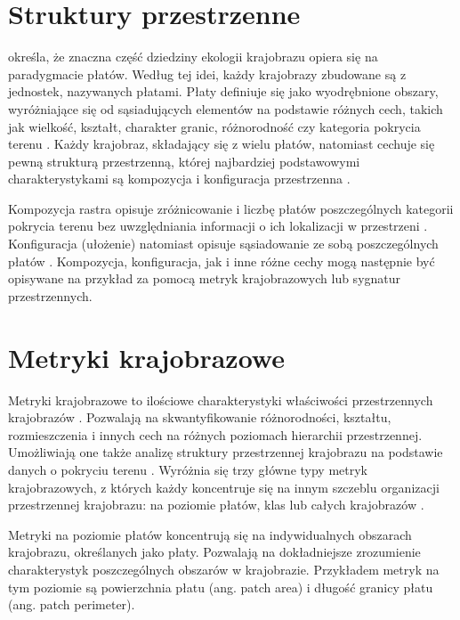 \documentclass{amuthesis}
\begin{document}
\hypertarget{struktury-przestrzenne}{%
\section{Struktury przestrzenne}\label{struktury-przestrzenne}}

\textcite{mcgarigal2009} określa, że znaczna część dziedziny ekologii
krajobrazu opiera się na paradygmacie płatów. Według tej idei, każdy
krajobrazy zbudowane są z jednostek, nazywanych płatami. Płaty definiuje
się jako wyodrębnione obszary, wyróżniające się od sąsiadujących
elementów na podstawie różnych cech, takich jak wielkość, kształt,
charakter granic, różnorodność czy kategoria pokrycia terenu
\autocite{forman1995land,solon2002,German_2004}. Każdy krajobraz,
składający się z wielu płatów, natomiast cechuje się pewną strukturą
przestrzenną, której najbardziej podstawowymi charakterystykami są
kompozycja i konfiguracja przestrzenna \autocite{Gustafson1998}.

Kompozycja rastra opisuje zróżnicowanie i liczbę płatów poszczególnych
kategorii pokrycia terenu bez uwzględniania informacji o ich lokalizacji
w przestrzeni \autocite{Gustafson1998,solon2002,kozak2014}. Konfiguracja
(ułożenie) natomiast opisuje sąsiadowanie ze sobą poszczególnych płatów
\autocite{Gustafson1998,solon2002,kozak2014}. Kompozycja, konfiguracja,
jak i inne różne cechy mogą następnie być opisywane na przykład za
pomocą metryk krajobrazowych lub sygnatur przestrzennych.

\hypertarget{metryki-krajobrazowe}{%
\section{Metryki krajobrazowe}\label{metryki-krajobrazowe}}

Metryki krajobrazowe to ilościowe charakterystyki właściwości
przestrzennych krajobrazów \autocite{McGarigal_fragstats}. Pozwalają na
skwantyfikowanie różnorodności, kształtu, rozmieszczenia i innych cech
na różnych poziomach hierarchii przestrzennej. Umożliwiają one także
analizę struktury przestrzennej krajobrazu na podstawie danych o
pokryciu terenu \autocite{Pukowiec_Kurda_Sobala_2016}. Wyróżnia się trzy
główne typy metryk krajobrazowych, z których każdy koncentruje się na
innym szczeblu organizacji przestrzennej krajobrazu: na poziomie płatów,
klas lub całych krajobrazów \autocite{McGarigal_fragstats}.

Metryki na poziomie płatów koncentrują się na indywidualnych obszarach
krajobrazu, określanych jako płaty. Pozwalają na dokładniejsze
zrozumienie charakterystyk poszczególnych obszarów w krajobrazie.
Przykładem metryk na tym poziomie są powierzchnia płatu (ang. patch
area) i długość granicy płatu (ang. patch perimeter).
\end{document}
